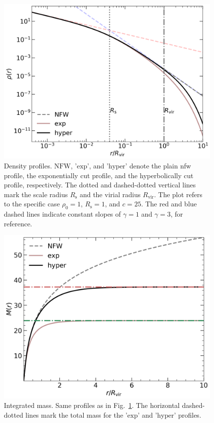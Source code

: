 \documentclass[twocolumn, a4paper]{article}
\begin{document}
\begin{figure}
    \centering
    \includegraphics[width=\columnwidth]{images/density_comparison.png}
    \caption{Density profiles. \(\text{NFW}\), '\(\text{exp}\)', and '\(\text{hyper}\)' denote the plain \acrshort{nfw} profile, the exponentially cut profile, and the hyperbolically cut profile, respectively. The dotted and dashed-dotted vertical lines mark the scale radius \(R_\text{s}\) and the virial radius \(R_\text{vir}\). The plot refers to the specific case \(\rho_0 = 1\), \(R_\text{s} = 1\), and \(c = 25\). The red and blue dashed lines indicate constant slopes of \(\gamma = 1\) and \(\gamma = 3\), for reference.}
    \label{fig:density_comp}
\end{figure}

\begin{figure}
    \centering
    \includegraphics[width=\columnwidth]{images/mass_comparison.png}
    \caption{Integrated mass. Same profiles as in Fig.~\ref{fig:density_comp}. The horizontal dashed-dotted lines mark the total mass for the '\(\text{exp}\)' and '\(\text{hyper}\)' profiles.}
    \label{fig:mass_comp}
\end{figure}
\end{document}
